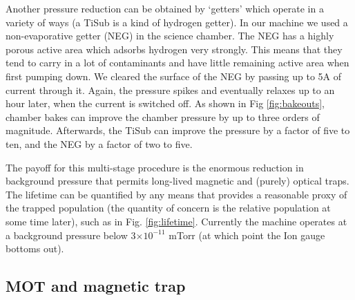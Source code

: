 	Another pressure reduction can be obtained by `getters' which operate in a variety of ways (a TiSub is a kind of hydrogen getter).
	In our machine we used a non-evaporative getter (NEG) in the science chamber.
	The NEG has a highly porous active area which adsorbs hydrogen very strongly.
	This means that they tend to carry in a lot of contaminants and have little remaining active area when first pumping down.
	We cleared the surface of the NEG by passing up to 5A of current through it.
	Again, the pressure spikes and eventually relaxes up to an hour later, when the current is switched off.
	As shown in Fig \ref{fig:bakeouts}, chamber bakes can improve the chamber pressure by up to three orders of magnitude.
	Afterwards, the TiSub can improve the pressure by a factor of five to ten, and the NEG by a factor of two to five.
		
	The payoff for this multi-stage procedure is the enormous reduction in background pressure that permits long-lived magnetic and (purely) optical traps.
	The lifetime can be quantified by any means that provides a reasonable proxy of the trapped population (the quantity of concern is the relative population at some time later), such as in Fig.	\ref{fig:lifetime}.
	Currently the machine operates at a background pressure below 3$\times10^{-11}$ mTorr (at which point the Ion gauge bottoms out).
		






\subsection{MOT and magnetic trap}
\label{sec:new_optics}

